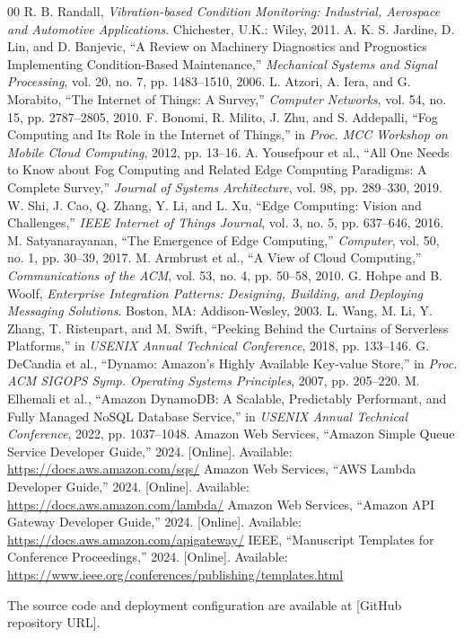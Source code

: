 \documentclass[conference]{IEEEtran}
\begin{document}
\begin{thebibliography}{00}
 R. B. Randall, \emph{Vibration-based Condition Monitoring: Industrial, Aerospace and Automotive Applications}. Chichester, U.K.: Wiley, 2011.
 A. K. S. Jardine, D. Lin, and D. Banjevic, ``A Review on Machinery Diagnostics and Prognostics Implementing Condition-Based Maintenance,'' \emph{Mechanical Systems and Signal Processing}, vol. 20, no. 7, pp. 1483--1510, 2006.
 L. Atzori, A. Iera, and G. Morabito, ``The Internet of Things: A Survey,'' \emph{Computer Networks}, vol. 54, no. 15, pp. 2787--2805, 2010.
 F. Bonomi, R. Milito, J. Zhu, and S. Addepalli, ``Fog Computing and Its Role in the Internet of Things,'' in \emph{Proc. MCC Workshop on Mobile Cloud Computing}, 2012, pp. 13--16.
 A. Yousefpour et al., ``All One Needs to Know about Fog Computing and Related Edge Computing Paradigms: A Complete Survey,'' \emph{Journal of Systems Architecture}, vol. 98, pp. 289--330, 2019.
 W. Shi, J. Cao, Q. Zhang, Y. Li, and L. Xu, ``Edge Computing: Vision and Challenges,'' \emph{IEEE Internet of Things Journal}, vol. 3, no. 5, pp. 637--646, 2016.
 M. Satyanarayanan, ``The Emergence of Edge Computing,'' \emph{Computer}, vol. 50, no. 1, pp. 30--39, 2017.
 M. Armbrust et al., ``A View of Cloud Computing,'' \emph{Communications of the ACM}, vol. 53, no. 4, pp. 50--58, 2010.
 G. Hohpe and B. Woolf, \emph{Enterprise Integration Patterns: Designing, Building, and Deploying Messaging Solutions}. Boston, MA: Addison-Wesley, 2003.
 L. Wang, M. Li, Y. Zhang, T. Ristenpart, and M. Swift, ``Peeking Behind the Curtains of Serverless Platforms,'' in \emph{USENIX Annual Technical Conference}, 2018, pp. 133--146.
 G. DeCandia et al., ``Dynamo: Amazon's Highly Available Key-value Store,'' in \emph{Proc. ACM SIGOPS Symp. Operating Systems Principles}, 2007, pp. 205--220.
 M. Elhemali et al., ``Amazon DynamoDB: A Scalable, Predictably Performant, and Fully Managed NoSQL Database Service,'' in \emph{USENIX Annual Technical Conference}, 2022, pp. 1037--1048.
 Amazon Web Services, ``Amazon Simple Queue Service Developer Guide,'' 2024. [Online]. Available: \url{https://docs.aws.amazon.com/sqs/}
 Amazon Web Services, ``AWS Lambda Developer Guide,'' 2024. [Online]. Available: \url{https://docs.aws.amazon.com/lambda/}
 Amazon Web Services, ``Amazon API Gateway Developer Guide,'' 2024. [Online]. Available: \url{https://docs.aws.amazon.com/apigateway/}
 IEEE, ``Manuscript Templates for Conference Proceedings,'' 2024. [Online]. Available: \url{https://www.ieee.org/conferences/publishing/templates.html}
\end{thebibliography}

The source code and deployment configuration are available at [GitHub repository URL].
\end{document}
